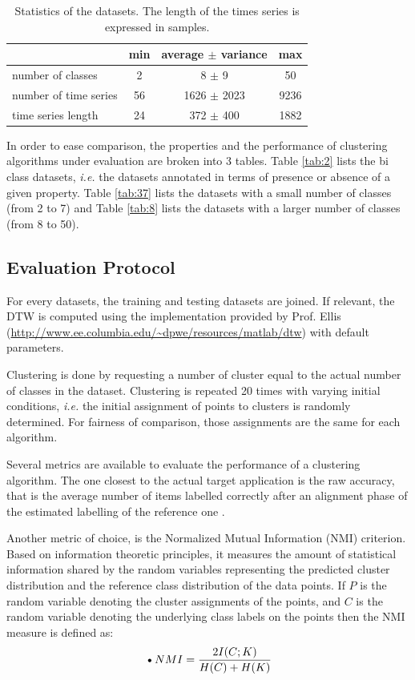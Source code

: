 \documentclass[a4paper,twoside]{article}
\begin{document}
\begin{table}
\center
\begin{tabular}{l|ccc}
& min & average $\pm$ variance & max \\
\hline
number of classes & 2 & 8 $\pm$ 9 & 50 \\
number of time series & 56 & 1626 $\pm$ 2023 & 9236 \\
time series length & 24 & 372 $\pm$ 400 & 1882 \\
\end{tabular}
\caption{\label{tab:dbs} Statistics of the datasets. The length of the times series is expressed in samples.}
\end{table}


In order to ease comparison, the properties and the performance of clustering algorithms under evaluation are broken into 3 tables. Table \ref{tab:2} lists the bi class datasets, \textit{i.e.} the datasets annotated in terms of presence or absence of a given property. Table \ref{tab:37} lists the datasets with a small number of classes (from 2 to 7) and Table \ref{tab:8} lists the datasets with a larger number of classes (from 8 to 50). 


\subsection{Evaluation Protocol}

For every datasets, the training and testing datasets are joined. If relevant, the DTW is computed using the implementation provided by Prof. Ellis (\url{http://www.ee.columbia.edu/~dpwe/resources/matlab/dtw}) with default parameters.

Clustering is done by requesting a number of cluster equal to the actual number of classes in the dataset. Clustering is repeated 20 times with varying initial conditions, \textit{i.e.} the initial assignment of points to clusters is randomly determined. For fairness of comparison, those assignments are the same for each algorithm.

Several metrics are available to evaluate the performance of a clustering algorithm. The one closest to the actual target application is the raw accuracy, that is the average number of items  labelled
correctly after an alignment phase of the estimated labelling of the reference one \cite{Kuhn1955Hungarian}. 

Another metric of choice, is the Normalized Mutual Information (NMI) criterion. Based on information theoretic principles, it measures the amount of statistical information shared by the random variables representing the predicted cluster distribution and the reference class distribution of the data points. If $P$ is the random variable denoting the cluster assignments of the points, and $C$ is the random variable denoting the underlying class labels on the points then the NMI measure is defined as:
\begin{equation}
\textbf{•}{NMI} = \frac{ 2\- I(C;K) }{H(C)+H(K)}
\end{equation}
\end{document}
